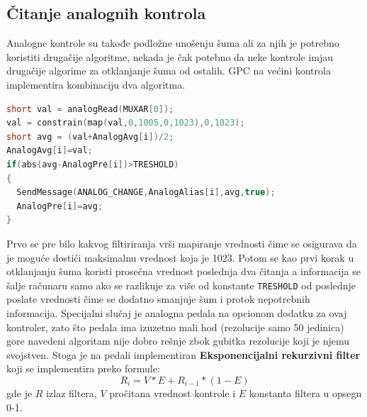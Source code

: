 \documentclass[12pt,oneside]{memoir}
\begin{document}
	\subsection{Čitanje analognih kontrola}
	Analogne kontrole su takođe podložne unošenju šuma ali za njih je potrebno koristiti drugačije algoritme, nekada je čak potebno da neke kontrole imjau drugačije algorime za otklanjanje šuma od ostalih. GPC na većini kontrola implementira kombinaciju dva algoritma.
	\newpage
	\begin{lstlisting}[language=C++]
short val = analogRead(MUXAR[0]);
val = constrain(map(val,0,1005,0,1023),0,1023);
short avg = (val+AnalogAvg[i])/2;
AnalogAvg[i]=val;
if(abs(avg-AnalogPre[i])>TRESHOLD)
{
  SendMessage(ANALOG_CHANGE,AnalogAlias[i],avg,true);
  AnalogPre[i]=avg;
}
	\end{lstlisting}
	Prvo se pre bilo kakvog filtiriranja vrši mapiranje vrednosti čime se osigurava da je moguće dostići maksimalnu vrednost koja je 1023. Potom se kao prvi korak u otklanjanju šuma koristi prosečna vrednost poslednja dva čitanja a informacija se šalje računaru samo ako se razlikuje za više od konstante \verb|TRESHOLD| od poslednje poslate vrednosti čime se dodatno smanjuje šum i protok nepotrebnih informacija.
	Specijalni slučaj je analogna pedala na opcionom dodatku za ovaj kontroler, zato što pedala ima izuzetno mali hod (rezolucije samo 50 jedinica) gore navedeni algoritam nije dobro rešnje zbok gubitka rezolucije koji je njemu svojstven. Stoga je na pedali implementiran \textbf{Eksponencijalni rekurzivni filter} koji se implementira preko formule:
	$$R_{i}=V*E+R_{i-1}*(1-E)$$
	gde je $R$ izlaz filtera, $V$ pročitana vrednost kontrole i $E$ konstanta filtera u opsegu 0-1.
\end{document}
